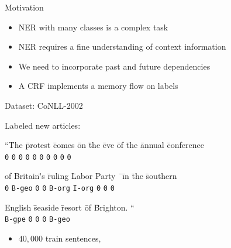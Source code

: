 \documentclass[final]{beamer}
\newlength{\onecolwid}
\begin{document}
\begin{frame}[t]
\begin{columns}[t]
\begin{column}{\onecolwid}
\begin{block}{Motivation}
    \begin{itemize}
      \item NER with many classes is a complex task
      \item NER requires a fine understanding of context information
      \item We need to incorporate past and future dependencies
      \item A CRF implements a memory flow on labels
    \end{itemize}

\end{block}

\begin{block}{Dataset: CoNLL-2002}

Labeled new articles:

\vspace{5mm}

\begin{tabbing}
``\=The \=protest \=comes \=on \=the \=eve \=of \=the \=annual \=conference \\
\>\texttt{0} \>\texttt{0} \>\texttt{0} \>\texttt{0} \>\texttt{0} \>\texttt{0} \>\texttt{0} \>\texttt{0} \>\texttt{0} \>\texttt{0}
\end{tabbing}

\vspace{5mm}

\begin{tabbing}
of \=Britain\='s \=ruling \=Labor \=Party \= \ \=in \=the \=southern \\

\texttt{0} \>\texttt{B-geo} \>\texttt{0} \>\texttt{0} \>\texttt{B-org} \>\texttt{I-org} \> \>\texttt{0} \>\texttt{0} \>\texttt{0}
\end{tabbing}

\vspace{5mm}

\begin{tabbing}
English \=seaside \=resort \=of \=Brighton. `` \\

\texttt{B-gpe} \>\texttt{0} \>\texttt{0} \>\texttt{0} \>\texttt{B-geo}
\end{tabbing}

\vspace{10mm}


\begin{itemize}
  \item $40,000$ train sentences,


\end{itemize}
\end{block}
\end{column}
\end{columns}
\end{frame}
\end{document}
